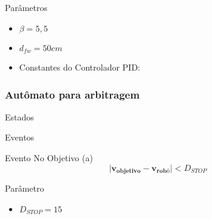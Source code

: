\begin{frame}
	\begin{exampleblock}{Parâmetros}
		\begin{itemize}
		  \item $\beta = 5,5$
		  \pause
		  \item $d_{fw} = 50 cm$
		  \pause
		  \item Constantes do Controlador PID:
		\end{itemize}
	\end{exampleblock}
\end{frame}

\begin{frame}
	\frametitle{Autômato para arbitragem}
	\begin{block}{Estados}
		
	\end{block}
\end{frame}

\begin{frame}
	\begin{exampleblock}{Eventos}
		
	\end{exampleblock}
\end{frame}

\begin{frame}
	\begin{block}{Evento No Objetivo (a)}
		\begin{equation}
			\mid \mathbf{v_{\text{objetivo}}} - \mathbf{v_{\text{robô}}} \mid < D_{STOP}
		\end{equation}
	\end{block}
	\pause
	\begin{exampleblock}{Parâmetro}
		\begin{itemize}
		  \item $D_{STOP} = 15$
		\end{itemize}
	\end{exampleblock}
\end{frame}


